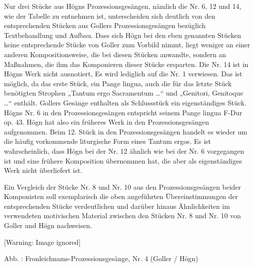\documentclass[a4paper]{article}
\newcounter{Abb}
\renewcommand\theAbb{\arabic{Abb}}
\begin{document}
{%
 \par}
Nur drei Stücke aus Högns Prozessionsgesängen, nämlich die Nr. 6, 12 und
14, wie der Tabelle zu entnehmen ist, unterscheiden sich deutlich von
den entsprechenden Stücken aus Gollers Prozessionsgesängen bezüglich
Textbehandlung und Aufbau. Dass sich Högn bei den eben genannten
Stücken keine entsprechende Stücke von Goller zum Vorbild nimmt, liegt
weniger an einer anderen Kompositionsweise, die bei diesen Stücken
anwandte, sondern an Maßnahmen, die ihm das Komponieren dieser Stücke
ersparten. Die Nr. 14 ist in Högns Werk nicht ausnotiert, Es wird
lediglich auf die Nr. 1 verwiesen. Das ist möglich, da das erste Stück,
ein Pange lingua, auch die für das letzte Stück benötigten Strophen
„Tantum ergo Sacramentum …“ und „Genitori, Genitoque …“ enthält.
Gollers Gesänge enthalten als Schlussstück ein eigenständiges Stück.
Högns Nr. 6 in den Prozessionsgesängen entspricht seinem Pange lingua
F-Dur op. 43. Högn hat also ein früheres Werk in den
Prozessionsgesängen aufgenommen. Beim 12. Stück in den
Prozessionsgesängen handelt es wieder um die häufig vorkommende
liturgische Form eines Tantum ergos. Es ist wahrscheinlich, dass Högn
bei der Nr. 12 ähnlich wie bei der Nr. 6 vorgegangen ist und eine
frühere Komposition übernommen hat, die aber als eigenständiges Werk
nicht überliefert ist.

Ein Vergleich der Stücke Nr. 8 und Nr. 10 aus den Prozessionsgesängen
beider Komponisten soll exemplarisch die oben angeführten
Übereinstimmungen der entsprechenden Stücke verdeutlichen und darüber
hinaus Ähnlichkeiten im verwendeten motivischen Material zwischen den
Stücken Nr. 8 und Nr. 10 von Goller und Högn nachweisen.

  [Warning: Image ignored] %
 

Abb. \stepcounter{Abb}{\theAbb}: Fronleichnams-Prozessionsgesänge, Nr. 4
(Goller / Högn)
\end{document}
